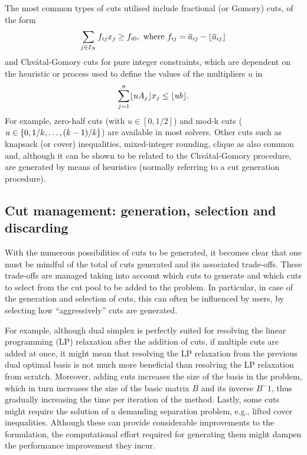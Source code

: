 The most common types of cuts utilised include fractional (or Gomory) cuts, of the form
%
\begin{equation*}
	\sum_{j \in I_N} f_{ij}x_j \geq f_{i0}, \text{ where } f_{ij} = \overline{a}_{ij} - \lfloor \overline{a}_{ij} \rfloor
\end{equation*}
%
and Chv\'atal-Gomory cuts for pure integer constraints, which are dependent on the heuristic or process used to define the values of the multipliers $u$ in
% 
\begin{equation*}
	\sum_{j=1}^n  \lfloor uA_j \rfloor x_j \leq \lfloor ub \rfloor.
\end{equation*} 
%
For example, zero-half cuts (with $u \in [0,1/2]$) and mod-k cuts ($u \in \left\{ 0, 1/k, \dots, (k-1)/k \right \}$) are available in most solvers. Other cuts such as knapsack (or cover) inequalities, mixed-integer rounding, clique as also common and, although it can be shown to be related to the Chv\'atal-Gomory procedure, are generated by means of heuristics (normally referring to a cut generation procedure).


\subsection{Cut management: generation, selection and discarding}

With the numerous possibilities of cuts to be generated, it becomes clear that one must be mindful of the total of cuts generated and its associated trade-offs. These trade-offs are managed taking into account which cuts to generate and which cuts to select from the cut pool to be added to the problem. In particular, in case of the generation and selection of cuts, this can often be influenced by users, by selecting how ``aggressively'' cuts are generated.

For example, although dual simplex is perfectly suited for resolving the linear programming (LP) relaxation after the addition of cuts, if multiple cuts are added at once, it might mean that resolving the LP relaxation from the previous dual optimal basis is not much more beneficial than resolving the LP relaxation from scratch. Moreover, adding cuts increases the size of the basis in the problem, which in turn increases the size of the basic matrix $B$ and its inverse $B^-1$, thus gradually increasing the time per iteration of the method. Lastly, some cuts might require the solution of a demanding separation problem, e.g., lifted cover inequalities. Although these can provide considerable improvements to the formulation, the computational effort required for generating them might dampen the performance improvement they incur.

